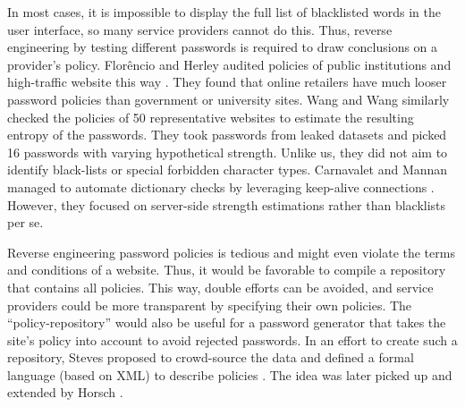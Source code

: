 In most cases, it is impossible to display the full list of blacklisted words in the user interface, so many service providers cannot do this. Thus, reverse engineering by testing different passwords is required to draw conclusions on a provider's policy. Florêncio and Herley audited policies of public institutions and high-traffic website this way \cite{Florencio2010WhereDoPoliciesComeFrom}. They found that online retailers have much looser password policies than government or university sites. Wang and Wang similarly checked the policies of 50 representative websites \cite{Wang2015EmperorsPolicies} to estimate the resulting entropy of the passwords. They took passwords from leaked datasets and picked 16 passwords with varying hypothetical strength. Unlike us, they did not aim to identify black-lists or special forbidden character types. Carnavalet and Mannan managed to automate dictionary checks by leveraging keep-alive connections \cite{Carnavalet2014AnalyzingPWStrengthMeters}. However, they focused on server-side strength estimations rather than blacklists per se. 

Reverse engineering password policies is tedious and might even violate the terms and conditions of a website. Thus, it would be favorable to compile a repository that contains all policies. This way, double efforts can be avoided, and service providers could be more transparent by specifying their own policies. The ``policy-repository'' would also be useful for a password generator that takes the site's policy into account to avoid rejected passwords. In an effort to create such a repository, Steves \etal proposed to crowd-source the data and defined a formal language (based on XML) to describe policies \cite{Steves2015PasswordPolicyLanguage}. The idea was later picked up and extended by Horsch \etal \cite{Horsch2016PasswordPolicyMarkup}. %


